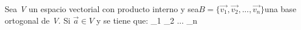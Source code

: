 \documentclass[preview]{standalone}
\begin{document}
\begin{center}
Sea \textit{V} un espacio vectorial con producto interno y sea$B = \{\vec{v_1}, \vec{v_2}, ..., \vec{v_n}\}$una base ortogonal de \textit{V}. Si $\vec{a} \in V$ y se tiene que: \eq \alpha_1  \+ \alpha_2  \+ ... \+ \alpha_n 
\end{center}
\end{document}
